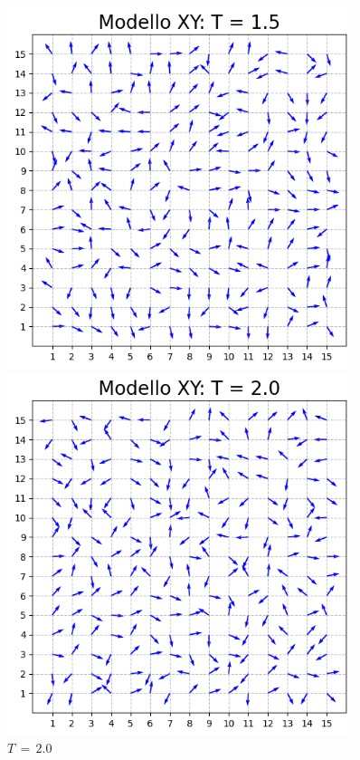 \begin{figure}[H]
    \begin{minipage}{0.45\textwidth}  
        \centering
        \includegraphics[page=1, width=0.9\textwidth]{Immagini/simModelloXY/conf_t1.5.png}
        \caption{$T\,=\,1.5$}
      \end{minipage}\hfill
      \begin{minipage}{0.45\textwidth}  
        \centering
        \includegraphics[page=1, width=0.9\textwidth]{Immagini/simModelloXY/conf_t2.0.png}
        \caption{$T\,=\,2.0$}
    \end{minipage}
    \vspace{12pt}
  

\end{figure}
